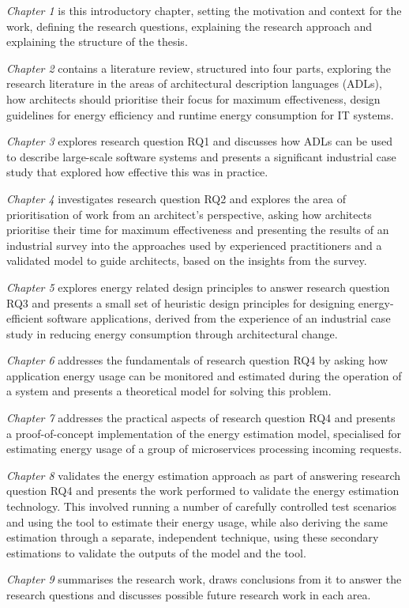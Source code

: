 \emph{Chapter 1} is this introductory chapter, setting the motivation and context for the work, defining the research questions, explaining the research approach and explaining the structure of the thesis.

\emph{Chapter 2} contains a literature review, structured into four parts, exploring the research literature in the areas of architectural description languages (ADLs), how architects should prioritise their focus for maximum effectiveness, design guidelines for energy efficiency and runtime energy consumption for IT systems.

\emph{Chapter 3} explores research question RQ1 and discusses how ADLs can be used to describe large-scale software systems and presents a significant industrial case study that explored how effective this was in practice.

\emph{Chapter 4} investigates research question RQ2 and explores the area of prioritisation of work from an architect's perspective, asking how architects prioritise their time for maximum effectiveness and presenting the results of an industrial survey into the approaches used by experienced practitioners and a validated model to guide architects, based on the insights from the survey.

\emph{Chapter 5} explores energy related design principles to answer research question RQ3 and presents a small set of heuristic design principles for designing energy-efficient software applications, derived from the experience of an industrial case study in reducing energy consumption through architectural change.

\emph{Chapter 6} addresses the fundamentals of research question RQ4 by asking how application energy usage can be monitored and estimated during the operation of a system and presents a theoretical model for solving this problem.

\emph {Chapter 7} addresses the practical aspects of research question RQ4 and presents a proof-of-concept implementation of the energy estimation model, specialised for estimating energy usage of a group of microservices processing incoming requests.

\emph{Chapter 8} validates the energy estimation approach as part of answering research question RQ4 and presents the work performed to validate the energy estimation technology. This involved running a number of carefully controlled test scenarios and using the tool to estimate their energy usage, while also deriving the same estimation through a separate, independent technique, using these secondary estimations to validate the outputs of the model and the tool.

\emph {Chapter 9} summarises the research work, draws conclusions from it to answer the research questions and discusses possible future research work in each area.




